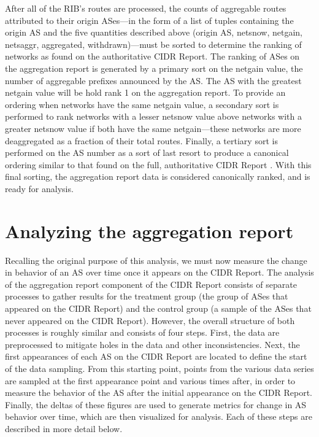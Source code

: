 After all of the RIB's routes are processed, the counts of aggregable routes
attributed to their origin ASes---in the form of a list of tuples containing
the origin AS and the five quantities described above (origin AS, netsnow,
netgain, netsaggr, aggregated, withdrawn)---must be sorted to determine the
ranking of networks as found on the authoritative CIDR Report. The ranking of
ASes on the aggregation report is generated by a primary sort on the netgain
value, the number of aggregable prefixes announced by the AS. The AS with the
greatest netgain value will be hold rank 1 on the aggregation report. To
provide an ordering when networks have the same netgain value, a secondary sort
is performed to rank networks with a lesser netsnow value above networks with a
greater netsnow value if both have the same netgain---these networks are more
deaggregated as a fraction of their total routes. Finally, a tertiary sort is
performed on the AS number as a sort of last resort to produce a canonical
ordering similar to that found on the full, authoritative CIDR Report
\cite{cidr-report-full}. With this final sorting, the aggregation report data
is considered canonically ranked, and is ready for analysis.

\section{Analyzing the aggregation report}
\label{sec:method_agg_report_analysis}

Recalling the original purpose of this analysis, we must now measure the change
in behavior of an AS over time once it appears on the CIDR Report. The analysis
of the aggregation report component of the CIDR Report consists of separate
processes to gather results for the treatment group (the group of ASes that
appeared on the CIDR Report) and the control group (a sample of the ASes that
never appeared on the CIDR Report). However, the overall structure of both
processes is roughly similar and consists of four steps. First, the data are
preprocessed to mitigate holes in the data and other inconsistencies. Next, the
first appearances of each AS on the CIDR Report are located to define the start
of the data sampling. From this starting point, points from the various data
series are sampled at the first appearance point and various times after, in
order to measure the behavior of the AS after the initial appearance on the
CIDR Report. Finally, the deltas of these figures are used to generate metrics
for change in AS behavior over time, which are then visualized for analysis.
Each of these steps are described in more detail below.

